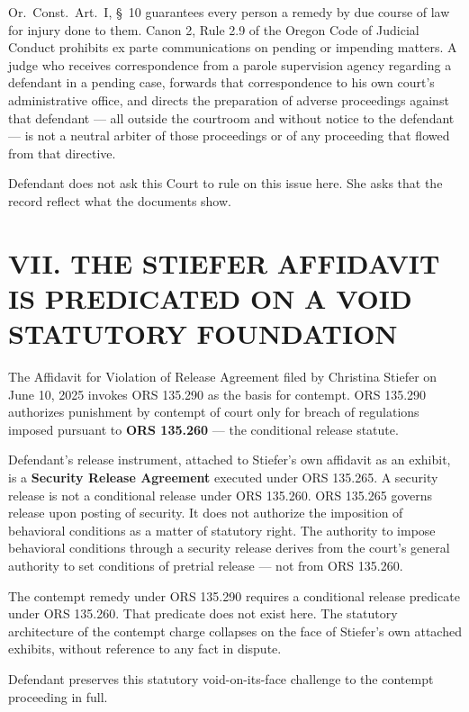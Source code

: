 \documentclass[12pt,letterpaper]{article}
\begin{document}
Or.\ Const.\ Art.\ I, \S~10 guarantees every person a remedy by due course of
law for injury done to them. Canon 2, Rule 2.9 of the Oregon Code of Judicial
Conduct prohibits ex parte communications on pending or impending matters. A
judge who receives correspondence from a parole supervision agency regarding a
defendant in a pending case, forwards that correspondence to his own court's
administrative office, and directs the preparation of adverse proceedings against
that defendant --- all outside the courtroom and without notice to the defendant
--- is not a neutral arbiter of those proceedings or of any proceeding that flowed
from that directive.

Defendant does not ask this Court to rule on this issue here. She asks that the
record reflect what the documents show.


\section*{VII. THE STIEFER AFFIDAVIT IS PREDICATED ON A VOID STATUTORY
FOUNDATION}

The Affidavit for Violation of Release Agreement filed by Christina Stiefer on
June 10, 2025 invokes ORS 135.290 as the basis for contempt. ORS 135.290
authorizes punishment by contempt of court only for breach of regulations imposed
pursuant to \textbf{ORS 135.260} --- the conditional release statute.

Defendant's release instrument, attached to Stiefer's own affidavit as an
exhibit, is a \textbf{Security Release Agreement} executed under ORS 135.265.
A security release is not a conditional release under ORS 135.260. ORS 135.265
governs release upon posting of security. It does not authorize the imposition of
behavioral conditions as a matter of statutory right. The authority to impose
behavioral conditions through a security release derives from the court's general
authority to set conditions of pretrial release --- not from ORS 135.260.

The contempt remedy under ORS 135.290 requires a conditional release predicate
under ORS 135.260. That predicate does not exist here. The statutory architecture
of the contempt charge collapses on the face of Stiefer's own attached exhibits,
without reference to any fact in dispute.

Defendant preserves this statutory void-on-its-face challenge to the contempt
proceeding in full.
\end{document}
